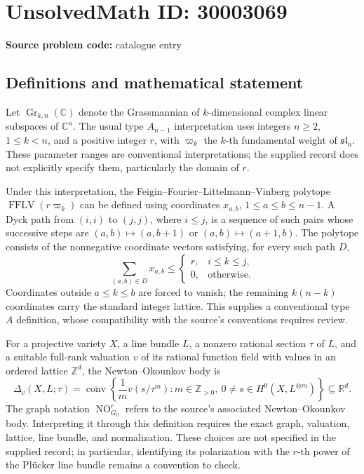 \documentclass[11pt]{article}
\newcommand{\Z}{\mathbb{Z}}
\newcommand{\R}{\mathbb{R}}
\newcommand{\C}{\mathbb{C}}
\begin{document}
\section*{UnsolvedMath ID: 30003069}
\textbf{Source problem code:} catalogue entry
\subsection{Definitions and mathematical statement}
Let \(\operatorname{Gr}_{k,n}(\C)\) denote the Grassmannian of \(k\)-dimensional complex linear subspaces of \(\C^n\). The usual type \(A_{n-1}\) interpretation uses integers \(n\geq 2\), \(1\leq k<n\), and a positive integer \(r\), with \(\varpi_k\) the \(k\)-th fundamental weight of \(\mathfrak{sl}_n\). These parameter ranges are conventional interpretations; the supplied record does not explicitly specify them, particularly the domain of \(r\).

Under this interpretation, the Feigin--Fourier--Littelmann--Vinberg polytope \(\operatorname{FFLV}(r\varpi_k)\) can be defined using coordinates \(x_{a,b}\), \(1\leq a\leq b\leq n-1\). A Dyck path from \((i,i)\) to \((j,j)\), where \(i\leq j\), is a sequence of such pairs whose successive steps are \((a,b)\mapsto(a,b+1)\) or \((a,b)\mapsto(a+1,b)\). The polytope consists of the nonnegative coordinate vectors satisfying, for every such path \(D\),
\[
\sum_{(a,b)\in D}x_{a,b}\leq
\begin{cases}
r,&i\leq k\leq j,\\
0,&\text{otherwise}.
\end{cases}
\]
Coordinates outside \(a\leq k\leq b\) are forced to vanish; the remaining \(k(n-k)\) coordinates carry the standard integer lattice. This supplies a conventional type \(A\) definition, whose compatibility with the source's conventions requires review.

For a projective variety \(X\), a line bundle \(L\), a nonzero rational section \(\tau\) of \(L\), and a suitable full-rank valuation \(v\) of its rational function field with values in an ordered lattice \(\Z^d\), the Newton--Okounkov body is
\[
\Delta_v(X,L;\tau)=\overline{\operatorname{conv}}\left\{\frac{1}{m}v(s/\tau^m):m\in\Z_{>0},\ 0\ne s\in H^0(X,L^{\otimes m})\right\}\subseteq\R^d.
\]
The graph notation \(\operatorname{NO}_{G_0}^{r}\) refers to the source's associated Newton--Okounkov body. Interpreting it through this definition requires the exact graph, valuation, lattice, line bundle, and normalization. These choices are not specified in the supplied record; in particular, identifying its polarization with the \(r\)-th power of the Pl\"ucker line bundle remains a convention to check.
\end{document}
